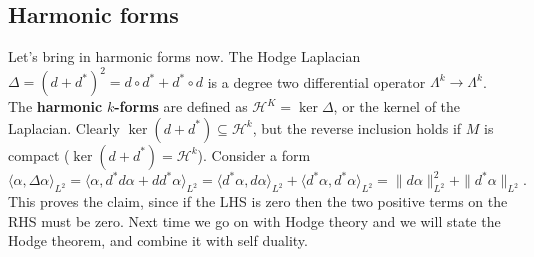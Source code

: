 \subsection{Harmonic forms}
Let's bring in harmonic forms now. The Hodge Laplacian $\Delta  = (d+d^*)^2 = d \circ d^* + d ^* \circ d$ is a degree two differential operator $\Lambda^k \to \Lambda^k$. The \textbf{harmonic} $k$\textbf{-forms} are defined as $\mathcal H^K =\ker \Delta $, or the kernel of the Laplacian. Clearly $\ker(d + d^*) \subseteq \mathcal H^k$, but the reverse inclusion holds if $M$ is compact ($\ker(d+d^*) = \mathcal H^k$). Consider a form 
\[
\langle \alpha ,\Delta \alpha  \rangle _{L^2}= \langle \alpha , d^* d \alpha  + dd^* \alpha  \rangle _{L^2}= \langle d^*\alpha , d\alpha  \rangle_{L^2} + \langle d^*\alpha , d^*\alpha  \rangle _{L^2}= \| d\alpha \|_{L^2}^2 + \| d^* \alpha \|_{L^2}.
\] 
This proves the claim, since if the LHS is zero then the two positive terms on the RHS must be zero. Next time we go on with Hodge theory and we will state the Hodge theorem, and combine it with self duality.


